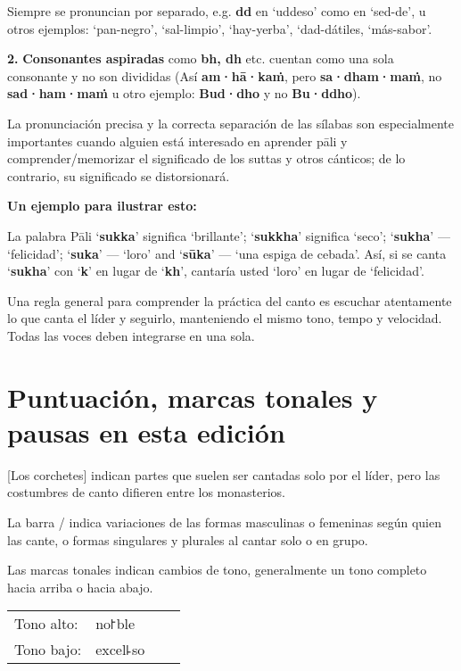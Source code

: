 Siempre se pronuncian por separado, e.g. \textbf{dd} en ‘uddeso’ como en
 ‘sed-de’, u otros ejemplos: ‘pan-negro’, ‘sal-limpio’, ‘hay-yerba’, ‘dad-dátiles, ‘más-sabor’.

\textbf{2.} \textbf{Consonantes aspiradas} como \textbf{bh, dh} etc.
cuentan como una sola consonante y no son divididas (Así
\textbf{am·hā·kaṁ}, pero \textbf{sa·dham·maṁ}, no \textbf{sad·ham·maṁ}
u otro ejemplo: \textbf{Bud·dho} y no \textbf{Bu·ddho}).

La pronunciación precisa y la correcta separación de las sílabas son especialmente importantes cuando alguien está interesado en aprender pāli y comprender/memorizar el significado de los suttas y otros cánticos; de lo contrario, su significado se distorsionará.


\textbf{Un ejemplo para ilustrar esto:}

La palabra Pāli ‘\textbf{sukka}’ significa ‘brillante’; ‘\textbf{sukkha}’ significa
‘seco’; ‘\textbf{sukha}’ --- ‘felicidad’; ‘\textbf{suka}’ --- ‘loro’ and
‘\textbf{sūka}’ --- ‘una espiga de cebada’.
Así, si se canta ‘\textbf{sukha}’ con ‘\textbf{k}’ en lugar de
‘\textbf{kh}’, cantaría usted ‘loro’ en lugar de ‘felicidad’.

Una regla general para comprender la práctica del canto es escuchar atentamente lo que canta el líder y seguirlo, manteniendo el mismo tono, tempo y velocidad. Todas las voces deben integrarse en una sola.

\section{Puntuación, marcas tonales y pausas en esta edición}

[Los corchetes] indican partes que suelen ser cantadas solo por el líder, pero las costumbres de canto difieren entre los monasterios.

La barra / indica variaciones de las formas masculinas o femeninas según quien las cante, o formas singulares y plurales al cantar solo o en grupo.

Las marcas tonales indican cambios de tono, generalmente un tono completo hacia arriba o hacia abajo.

\begin{tabular}{llll}
	Tono alto: & no꜓ble \\
	Tono bajo: & excel꜕so \\
\end{tabular}

%
